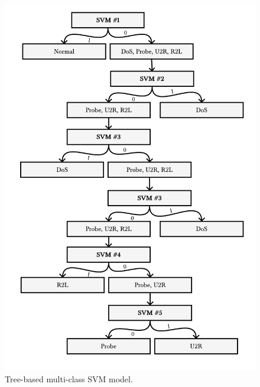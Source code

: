 \begin{figure}[ht!]
    \centering
    \includegraphics[width=.75\textwidth]{parts/chap-2/img-2/model-svm-2.png}
    \caption{Tree-based multi-class SVM model.} 
    \label{mach:svm-model-2}
\end{figure}

